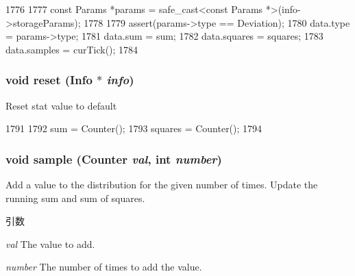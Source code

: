 \begin{DoxyCode}
1776     {
1777         const Params *params = safe_cast<const Params *>(info->storageParams);
1778 
1779         assert(params->type == Deviation);
1780         data.type = params->type;
1781         data.sum = sum;
1782         data.squares = squares;
1783         data.samples = curTick();
1784     }
\end{DoxyCode}
\hypertarget{classStats_1_1AvgSampleStor_a10d9d71be6e0d2194999bb5dd5280e2d}{
\subsubsection[{reset}]{\setlength{\rightskip}{0pt plus 5cm}void reset ({\bf Info} $\ast$ {\em info})}}
\label{classStats_1_1AvgSampleStor_a10d9d71be6e0d2194999bb5dd5280e2d}
Reset stat value to default 


\begin{DoxyCode}
1791     {
1792         sum = Counter();
1793         squares = Counter();
1794     }
\end{DoxyCode}
\hypertarget{classStats_1_1AvgSampleStor_a57fea70de4ed8fee9ec9e9d9cca6f9fa}{
\subsubsection[{sample}]{\setlength{\rightskip}{0pt plus 5cm}void sample ({\bf Counter} {\em val}, \/  int {\em number})}}
\label{classStats_1_1AvgSampleStor_a57fea70de4ed8fee9ec9e9d9cca6f9fa}
Add a value to the distribution for the given number of times. Update the running sum and sum of squares. 
\begin{DoxyParams}{引数}
\item[{\em val}]The value to add. \item[{\em number}]The number of times to add the value. \end{DoxyParams}



